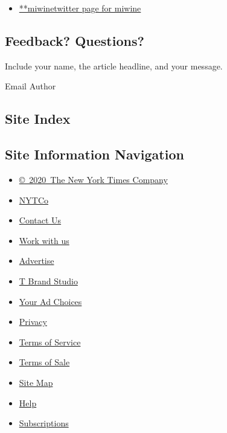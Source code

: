 \begin{itemize}
\tightlist
\item
  \href{https://twitter.com/miwine}{**miwinetwitter page for miwine}
\end{itemize}

\hypertarget{feedback-questions}{%
\subsection{Feedback? Questions?}\label{feedback-questions}}

Include your name, the article headline, and your message.

Email Author

\hypertarget{site-index}{%
\subsection{Site Index}\label{site-index}}

\hypertarget{site-information-navigation}{%
\subsection{Site Information
Navigation}\label{site-information-navigation}}

\begin{itemize}
\tightlist
\item
  \href{https://help.nytimes.com/hc/en-us/articles/115014792127-Copyright-notice}{©~2020~The
  New York Times Company}
\end{itemize}

\begin{itemize}
\tightlist
\item
  \href{https://www.nytco.com/}{NYTCo}
\item
  \href{https://help.nytimes.com/hc/en-us/articles/115015385887-Contact-Us}{Contact
  Us}
\item
  \href{https://www.nytco.com/careers/}{Work with us}
\item
  \href{https://nytmediakit.com/}{Advertise}
\item
  \href{http://www.tbrandstudio.com/}{T Brand Studio}
\item
  \href{https://www.nytimes.com/privacy/cookie-policy\#how-do-i-manage-trackers}{Your
  Ad Choices}
\item
  \href{https://www.nytimes.com/privacy}{Privacy}
\item
  \href{https://help.nytimes.com/hc/en-us/articles/115014893428-Terms-of-service}{Terms
  of Service}
\item
  \href{https://help.nytimes.com/hc/en-us/articles/115014893968-Terms-of-sale}{Terms
  of Sale}
\item
  \href{https://spiderbites.nytimes.com}{Site Map}
\item
  \href{https://help.nytimes.com/hc/en-us}{Help}
\item
  \href{https://www.nytimes.com/subscription?campaignId=37WXW}{Subscriptions}
\end{itemize}
